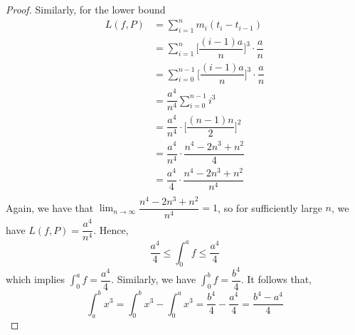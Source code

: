 \documentclass[10pt,letterpaper]{article}
\begin{document}
\begin{proof}
	Similarly, for the lower bound
	\begin{align*}
	L(f, P) 
	     &= \displaystyle\sum_{i=1}^{n} m_i(t_{i} - t_{i-1}) \\
		 &= \displaystyle\sum_{i=1}^{n} \bigg[\dfrac{(i - 1)a}{n} \bigg]^3 \cdot \dfrac{a}{n} \\
		 &= \displaystyle\sum_{i=0}^{n-1} \bigg[\dfrac{(i - 1)a}{n} \bigg]^3 \cdot \dfrac{a}{n} \\		
		 &= \dfrac{a^4}{n^4} \displaystyle\sum_{i=0}^{n-1} i^3 \\ 
		 &= \dfrac{a^4}{n^4} \cdot \bigg[\dfrac{(n - 1)n}{2}\bigg]^2 \\
		 &= \dfrac{a^4}{n^4} \cdot \dfrac{n^4 - 2n^3 + n^2}{4} \\
		 &= \dfrac{a^4}{4} \cdot \dfrac{n^4 - 2n^3 + n^2}{n^4} \\ 
	\end{align*}	
	Again, we have that $\displaystyle\lim_{n\to \infty}\dfrac{n^4 - 2n^3 + n^2}{n^4} = 1$, so for sufficiently large $n$, 
	we have $L(f, P) = \dfrac{a^4}{n^4}$. Hence,
	$$\dfrac{a^4}{4} \leq \displaystyle\int_{0}^{a} f \leq \dfrac{a^4}{4}$$
	which implies $\displaystyle\int_{0}^{a} f = \dfrac{a^4}{4}$. 
	Similarly, we have
	$\displaystyle\int_{0}^{b} f = \dfrac{b^4}{4}$.
	It follows that,
	$$\displaystyle\int_{a}^{b} x^3 = \displaystyle\int_{0}^{b} x^3 - \displaystyle\int_{0}^{a} x^3 =
	 \dfrac{b^4}{4} - \dfrac{a^4}{4} = \dfrac{b^4 - a^4}{4} $$
	
	\end{proof}
	
\end{document}
